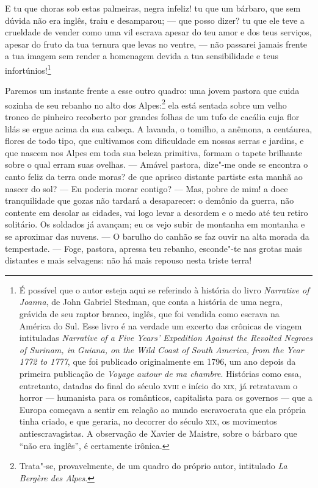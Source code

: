  E tu que choras sob estas palmeiras, negra infeliz! tu que um bárbaro,
que sem dúvida não era inglês, traiu e desamparou; --- que posso dizer?
tu que ele teve a crueldade de vender como uma vil escrava apesar do
teu amor e dos teus serviços, apesar do fruto da tua ternura que levas
no ventre, --- não passarei jamais frente a tua imagem sem render a
homenagem devida a tua sensibilidade e teus infortúnios!\footnote{ É
possível que o autor esteja aqui se referindo à história do livro
\textit{Narrative of Joanna}, de John Gabriel Stedman, que conta a
história de uma negra, grávida de seu raptor branco, inglês, que foi
vendida como escrava na América do Sul. Esse livro é na verdade um
excerto das crônicas de viagem intituladas \textit{Narrative of a Five
Years' Expedition Against the Revolted Negroes of
Surinam, in Guiana, on the Wild Coast of South America, from the Year
1772 to 1777}, que foi publicado originalmente em 1796, um ano depois
da primeira publicação de \textit{Voyage autour de ma chambre}.
Histórias como essa, entretanto, datadas do final do século \textsc{xviii} e
início do \textsc{xix}, já retratavam o horror --- humanista para os românticos,
capitalista para os governos --- que a Europa começava a sentir em
relação ao mundo escravocrata que ela própria tinha criado, e que
geraria, no decorrer do século \textsc{xix}, os movimentos antiescravagistas. A
observação de Xavier de Maistre, sobre o bárbaro que ``não era inglês'',
é certamente irônica.}

 Paremos um instante frente a esse outro quadro: uma jovem pastora que
cuida sozinha de seu rebanho no alto dos Alpes:\footnote{ Trata"-se,
provavelmente, de um quadro do próprio autor, intitulado \textit{La
Bergère des Alpes}.} ela está sentada sobre um velho tronco de
pinheiro recoberto por grandes folhas de um tufo de cacália cuja flor
lilás se ergue acima da sua cabeça. A lavanda, o tomilho, a anêmona, a
centáurea, flores de todo tipo, que cultivamos com dificuldade em
nossas serras e jardins, e que nascem nos Alpes em toda sua beleza
primitiva, formam o tapete brilhante sobre o qual erram suas ovelhas.
--- Amável pastora, dize"-me onde se encontra o canto feliz da terra
onde moras? de que aprisco distante partiste esta manhã ao nascer do
sol? --- Eu poderia morar contigo? --- Mas, pobre de mim! a doce
tranquilidade que gozas não tardará a desaparecer: o demônio da guerra,
não contente em desolar as cidades, vai logo levar a desordem e o medo
até teu retiro solitário. Os soldados já avançam; eu os vejo subir de
montanha em montanha e se aproximar das nuvens. --- O barulho do canhão
se faz ouvir na alta morada da tempestade. --- Foge, pastora, apressa
teu rebanho, esconde"-te nas grotas mais distantes e mais selvagens: não
há mais repouso nesta triste terra!

